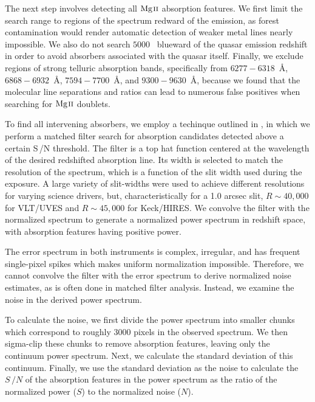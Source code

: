 \documentclass[iop,apj,numberedappendix,appendixfloats,twocolappendix]{emulateapj}
\begin{document}
The next step involves detecting all ${\hbox{{\rm Mg}\kern 0.1em{\sc ii}}}$ absorption features. We first limit the search range to regions of the spectrum redward of the {\Lya} emission, as {\Lya} forest contamination would render automatic detection of weaker metal lines nearly impossible. We also do not search $5000$~{\kms} blueward of the quasar emission redshift in order to avoid absorbers associated with the quasar itself. Finally, we exclude regions of strong telluric absorption bands, specifically from $6277 - 6318$~{\AA}, $6868 - 6932$~{\AA}, $7594 - 7700$~{\AA}, and $9300 - 9630$~{\AA}, because we found that the molecular line separations and ratios can lead to numerous false positives when searching for ${\hbox{{\rm Mg}\kern 0.1em{\sc ii}}}$ doublets.

To find all intervening {\MgIIdblt} absorbers, we employ a techinque outlined in \cite{Zhu2013}, in which we perform a matched filter search for absorption candidates detected above a certain S\,/N threshold. The filter is a top hat function centered at the wavelength of the desired redshifted absorption line. Its width is selected to match the resolution of the spectrum, which is a function of the slit width used during the exposure. A large variety of slit-widths were used to achieve different resolutions for varying science drivers, but, characteristically for a 1.0 arcsec slit, $R \sim 40,000$ for VLT/UVES and $R \sim 45,000$ for Keck/HIRES. We convolve the filter with the normalized spectrum to generate a normalized power spectrum in redshift space, with absorption features having positive power.

The error spectrum in both instruments is complex, irregular, and has frequent single-pixel spikes which makes uniform normalization impossible. Therefore, we cannot convolve the filter with the error spectrum to derive normalized noise estimates, as is often done in matched filter analysis. Instead, we examine the noise in the derived power spectrum.

To calculate the noise, we first divide the power spectrum into smaller chunks which correspond to roughly 3000 pixels in the observed spectrum. We then sigma-clip these chunks to remove absorption features, leaving only the continuum power spectrum. Next, we calculate the standard deviation of this continuum. Finally, we use the standard deviation as the noise to calculate the $S\,/N$ of the absorption features in the power spectrum as the ratio of the normalized power ($S$) to the normalized noise ($N$).
\end{document}
